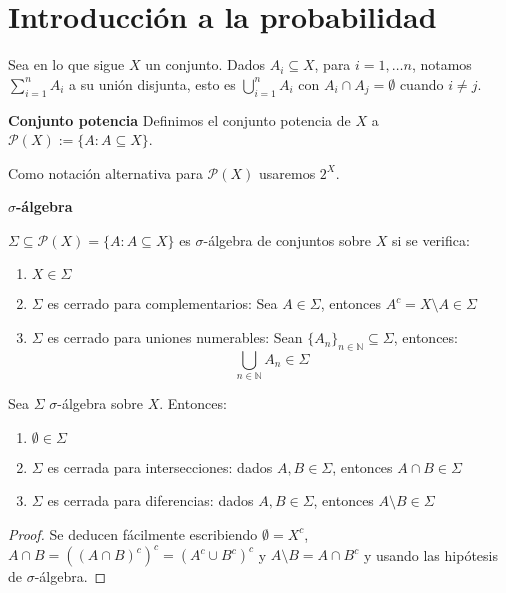 \section{Introducción a la probabilidad}

Sea en lo que sigue $X$ un conjunto. Dados $A_i \subseteq X$, para $i=1, \ldots n$, notamos $\sum_{i=1}^n A_i$
a su unión disjunta, esto es $\bigcup_{i=1}^n A_i$ con $A_i \cap A_j = \emptyset$ cuando $i\neq j$.

\begin{definition} \textbf{Conjunto potencia}
 Definimos el conjunto potencia de $X$ a $\mathcal{P}(X):= \{A: A\subseteq X\}$.
 
 Como notación alternativa para $\mathcal{P}(X)$ usaremos $2^X$.
\end{definition}


\begin{definition} \textbf{$\sigma$-álgebra}

 $\Sigma \subseteq \mathcal{P}(X) = \{A: A\subseteq X\}$ es $\sigma$-álgebra de conjuntos sobre $X$ si se verifica:
 
 \begin{enumerate}[i]
  \item $X \in \Sigma$
  \item $\Sigma$ es cerrado para complementarios: Sea $A\in \Sigma$, entonces $A^c = X\setminus A \in \Sigma$
  \item $\Sigma$ es cerrado para uniones numerables: Sean $\{A_n\}_{n\in\mathbb{N}} \subseteq \Sigma$, entonces: 
  \[\underset{n\in\mathbb{N}}{\bigcup} A_n \in \Sigma\]
 \end{enumerate}
\end{definition}

\begin{fact}
 Sea $\Sigma$ $\sigma$-álgebra sobre $X$. Entonces:
 
 \begin{enumerate}[i]
  \item $\emptyset \in \Sigma$
  \item $\Sigma$ es cerrada para intersecciones: dados $A,B \in \Sigma$, entonces $A\cap B \in \Sigma$
  \item $\Sigma$ es cerrada para diferencias: dados $A,B \in \Sigma$, entonces $A\setminus B \in \Sigma$
 \end{enumerate}
 
 \label{fact:propsigma}
\end{fact}

\begin{proof}
 Se deducen fácilmente escribiendo $\emptyset = X^c$, $A\cap B = ((A\cap B)^c)^c = (A^c \cup B^c)^c$ y $A\setminus B = A\cap B^c$
 y usando las hipótesis de $\sigma$-álgebra.
\end{proof}



